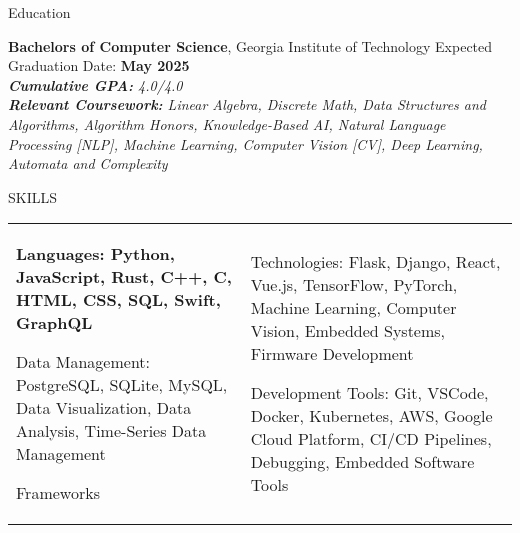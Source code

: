 \documentclass{resume} %
\begin{document}

\begin{rSection}{Education}

{\bf Bachelors of Computer Science}, Georgia Institute of Technology \hfill {Expected Graduation Date: \textbf{May 2025}}
\vspace{0.75mm} \\
\textit{\textbf{Cumulative GPA:} 4.0/4.0} \\
\textit{\textbf{Relevant Coursework:} Linear Algebra, Discrete Math, Data Structures and Algorithms, Algorithm Honors, Knowledge-Based AI, Natural Language Processing [NLP], Machine Learning, Computer Vision [CV], Deep Learning, Automata and Complexity}

\end{rSection}



\begin{rSection}{SKILLS}

\begin{tabular}{ @{} >{\bfseries}l @{\hspace{2ex}} l }

Languages: Python, JavaScript, Rust, C++, C, HTML, CSS, SQL, Swift, GraphQL

Data Management: PostgreSQL, SQLite, MySQL, Data Visualization, Data Analysis, Time-Series Data Management

Frameworks & Technologies: Flask, Django, React, Vue.js, TensorFlow, PyTorch, Machine Learning, Computer Vision, Embedded Systems, Firmware Development

Development Tools: Git, VSCode, Docker, Kubernetes, AWS, Google Cloud Platform, CI/CD Pipelines, Debugging, Embedded Software Tools
\end{tabular}
\end{rSection}
\end{document}
